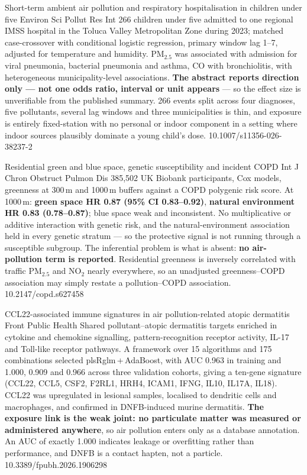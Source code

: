 \documentclass[10pt]{article}
\begin{document}

{Short-term ambient air pollution and respiratory hospitalisation in children under five}
{Environ Sci Pollut Res Int}
{266 children under five admitted to one regional IMSS hospital in the Toluca Valley
Metropolitan Zone during 2023; matched case-crossover with conditional logistic
regression, primary window lag 1--7, adjusted for temperature and humidity. PM$_{2.5}$
was associated with admission for viral pneumonia, bacterial pneumonia and asthma, CO
with bronchiolitis, with heterogeneous municipality-level associations. \textbf{The
abstract reports direction only --- not one odds ratio, interval or unit appears} --- so
the effect size is unverifiable from the published summary. 266 events split across four
diagnoses, five pollutants, several lag windows and three municipalities is thin, and
exposure is entirely fixed-station with no personal or indoor component in a setting
where indoor sources plausibly dominate a young child's dose.}
{10.1007/s11356-026-38237-2}

{Residential green and blue space, genetic susceptibility and incident COPD}
{Int J Chron Obstruct Pulmon Dis}
{385{,}502 UK Biobank participants, Cox models, greenness at 300\,m and 1000\,m buffers
against a COPD polygenic risk score. At 1000\,m: \textbf{green space HR 0.87
(95\% CI 0.83--0.92)}, \textbf{natural environment HR 0.83 (0.78--0.87)}; blue space weak
and inconsistent. No multiplicative or additive interaction with genetic risk, and the
natural-environment association held in every genetic stratum --- so the protective signal
is not running through a susceptible subgroup. The inferential problem is what is absent:
\textbf{no air-pollution term is reported}. Residential greenness is inversely correlated
with traffic PM$_{2.5}$ and NO$_2$ nearly everywhere, so an unadjusted greenness--COPD
association may simply restate a pollution--COPD association.}
{10.2147/copd.s627458}




{CCL22-associated immune signatures in air pollution-related atopic dermatitis}
{Front Public Health}
{Shared pollutant--atopic dermatitis targets enriched in cytokine and chemokine
signalling, pattern-recognition receptor activity, IL-17 and Toll-like receptor pathways.
A framework over 15 algorithms and 175 combinations selected plsRglm\,+\,AdaBoost, with
AUC 0.963 in training and 1.000, 0.909 and 0.966 across three validation cohorts, giving
a ten-gene signature (CCL22, CCL5, CSF2, F2RL1, HRH4, ICAM1, IFNG, IL10, IL17A, IL18).
CCL22 was upregulated in lesional samples, localised to dendritic cells and macrophages,
and confirmed in DNFB-induced murine dermatitis. \textbf{The exposure link is the weak
joint: no particulate matter was measured or administered anywhere}, so air pollution
enters only as a database annotation. An AUC of exactly 1.000 indicates leakage or
overfitting rather than performance, and DNFB is a contact hapten, not a particle.}
{10.3389/fpubh.2026.1906298}
\end{document}
